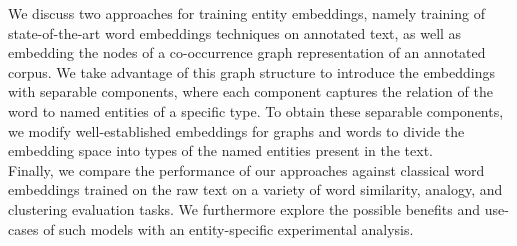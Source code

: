 We discuss two approaches for training entity embeddings, namely training of state-of-the-art word embeddings techniques on annotated text, as well as embedding the nodes of a co-occurrence graph representation of an annotated corpus. We take advantage of this graph structure to introduce the embeddings with separable components, where each component captures the relation of the word to named entities of a specific type. To obtain these separable components, we modify well-established embeddings for graphs and words to divide the embedding space into types of the named entities present in the text. \\
Finally, we compare the performance of our approaches against classical word embeddings trained on the raw text on a variety of word similarity, analogy, and clustering evaluation tasks. We furthermore explore the possible benefits and use-cases of such  models with an entity-specific experimental analysis. 


